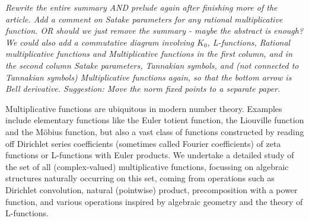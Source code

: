 \documentclass[a4paper]{article}
\begin{document}
{
}


\emph{Rewrite the entire summary AND prelude again after finishing more of the article. Add a comment on Satake parameters for any rational multiplicative function. OR should we just remove the summary - maybe the abstract is enough? We could also add a commutative diagram involving $K_0$, L-functions, Rational multiplicative functions and Multiplicative functions in the first column, and in the second column Satake parameters, Tannakian symbols, and (not connected to Tannakian symbols) Multiplicative functions again, so that the bottom arrow is Bell derivative. Suggestion: Move the norm fixed points to a separate paper.}

Multiplicative functions are ubiquitous in modern number theory. Examples include elementary functions like the Euler totient function, the Liouville function and the M\"obius function, but also a vast class of functions constructed by reading off Dirichlet series coefficients (sometimes called Fourier coefficients) of zeta functions or L-functions with Euler products. We undertake a detailed study of the set of all (complex-valued) multiplicative functions, focussing on algebraic structures naturally occurring on this set, coming from operations such as Dirichlet convolution, natural (pointwise) product, precomposition with a power function, and various operations inspired by algebraic geometry and the theory of L-functions. 
\end{document}
